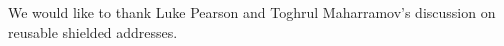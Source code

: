 
We would like to thank Luke Pearson and Toghrul Maharramov's discussion on reusable shielded addresses.

